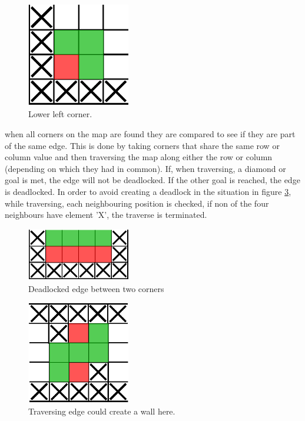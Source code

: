 \begin{figure}[H]
    \centering
    \includegraphics[width=0.40\textwidth]{images/deadlock_corner_leftup}
    \caption{Lower left corner.}
    \label{fig:deadlockcorner}
\end{figure}

when all corners on the map are found they are compared to see if they are part of the same edge.
This is done by taking corners that share the same row or column value and then traversing the map along either the row or column (depending on which they had in common). 
If, when traversing, a diamond or goal is met, the edge will not be deadlocked.
If the other goal is reached, the edge is deadlocked.
In order to avoid creating a deadlock in the situation in figure \ref{fig:deadlockopposite}, while traversing, each neighbouring position is checked, if non of the four neighbours have element 'X', the traverse is terminated.

%

\begin{figure}[H]
    \centering
    \includegraphics[width=0.40\textwidth]{images/deadlock_edge}
    \caption{Deadlocked edge between two corners}
   	\label{fig:deadlockedge}
\end{figure}
 
 \begin{figure}[H]
	\centering
    \includegraphics[width=0.40\textwidth]{images/deadlock_opposite}
    \caption{Traversing edge could create a wall here. }
	\label{fig:deadlockopposite}
\end{figure}
  
